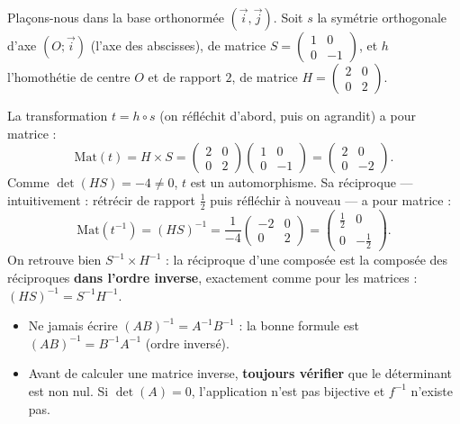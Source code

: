 \documentclass[11pt]{article}
\begin{document}
\begin{exemplebox}
Plaçons-nous dans la base orthonormée $(\vec{i},\vec{j})$. Soit $s$ la symétrie orthogonale d'axe $(O;\vec{i})$ (l'axe des abscisses), de matrice $S = \begin{pmatrix} 1 & 0 \\ 0 & -1 \end{pmatrix}$, et $h$ l'homothétie de centre $O$ et de rapport $2$, de matrice $H = \begin{pmatrix} 2 & 0 \\ 0 & 2 \end{pmatrix}$.

La transformation $t = h \circ s$ (on réfléchit d'abord, puis on agrandit) a pour matrice :
\[ \mathrm{Mat}(t) = H \times S = \begin{pmatrix} 2 & 0 \\ 0 & 2 \end{pmatrix}\begin{pmatrix} 1 & 0 \\ 0 & -1 \end{pmatrix} = \begin{pmatrix} 2 & 0 \\ 0 & -2 \end{pmatrix}. \]
Comme $\det(H S) = -4 \neq 0$, $t$ est un automorphisme. Sa réciproque — intuitivement : rétrécir de rapport $\tfrac{1}{2}$ puis réfléchir à nouveau — a pour matrice :
\[ \mathrm{Mat}(t^{-1}) = (HS)^{-1} = \frac{1}{-4}\begin{pmatrix} -2 & 0 \\ 0 & 2 \end{pmatrix} = \begin{pmatrix} \tfrac{1}{2} & 0 \\ 0 & -\tfrac{1}{2} \end{pmatrix}. \]
On retrouve bien $S^{-1} \times H^{-1}$ : la réciproque d'une composée est la composée des réciproques \textbf{dans l'ordre inverse}, exactement comme pour les matrices : $(HS)^{-1} = S^{-1}H^{-1}$.
\end{exemplebox}

\begin{attention}
\begin{itemize}
\item Ne jamais écrire $(AB)^{-1} = A^{-1}B^{-1}$ : la bonne formule est $(AB)^{-1} = B^{-1}A^{-1}$ (ordre inversé).
\item Avant de calculer une matrice inverse, \textbf{toujours vérifier} que le déterminant est non nul. Si $\det(A) = 0$, l'application n'est pas bijective et $f^{-1}$ n'existe pas.
\end{itemize}
\end{attention}
\end{document}
